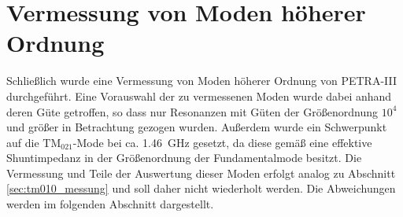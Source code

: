 \section{Vermessung von Moden höherer Ordnung}
\label{sec:hom_messung}
Schließlich wurde eine Vermessung von Moden höherer Ordnung von PETRA-III durchgeführt.
Eine Vorauswahl der zu vermessenen Moden wurde dabei anhand deren Güte getroffen, so dass nur Resonanzen mit Güten der Größenordnung $10^4$ und größer in Betrachtung gezogen wurden.
Außerdem wurde ein Schwerpunkt auf die $\mathrm{TM}_{021}$-Mode bei ca. \SI{1.46}{GHz} gesetzt, da diese gemäß \cite{schedler} eine effektive Shuntimpedanz in der Größenordnung der Fundamentalmode besitzt.
Die Vermessung und Teile der Auswertung dieser Moden erfolgt analog zu Abschnitt \ref{sec:tm010_messung} und soll daher nicht wiederholt werden.
Die Abweichungen werden im folgenden Abschnitt dargestellt.


